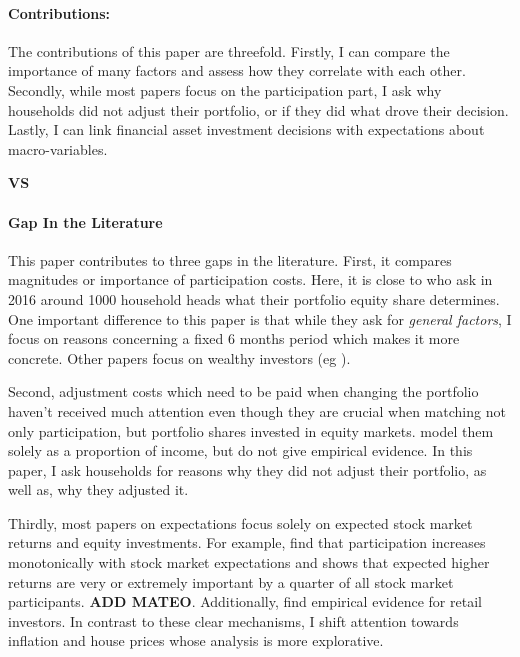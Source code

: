 \documentclass[ProjectABM]{subfiles}
\begin{document}
\paragraph{Contributions:}
The contributions of this paper are threefold. Firstly, I can compare the importance of many factors and assess how they correlate with each other. Secondly, while most papers focus on the participation part, I ask why households did not adjust their portfolio, or if they did what drove their decision. Lastly, I can link financial asset investment decisions with expectations about macro-variables.

\textbf{VS}

\paragraph{Gap In the Literature}
This paper contributes to three gaps in the literature. First, it compares magnitudes or importance of participation costs. Here, it is close to \cite{choi_2020} who ask in 2016 around 1000 household heads what their portfolio equity share determines. One important difference to this paper is that while they ask for \textit{general factors}, I focus on reasons concerning a fixed 6 months period which makes it more concrete. Other papers focus on wealthy investors (eg \cite{bender_et_al_2019}). 

Second, adjustment costs which need to be paid when changing the portfolio haven't received much attention even though they are crucial when matching not only participation, but portfolio shares invested in equity markets. \cite{bonaparte_et_al_2012adjustment} model them solely as a proportion of income, but do not give empirical evidence. In this paper, I ask households for reasons why they did not adjust their portfolio, as well as, why they adjusted it.

Thirdly, most papers on expectations focus solely on expected stock market returns and equity investments. For example, \cite{arrondel_et_al_2014subjective_return_expectation} find that participation increases monotonically with stock market expectations and \cite{choi_2020} shows that expected higher returns are very or extremely important by a quarter of all stock market participants. \textbf{ADD MATEO}. Additionally, \cite{giglio_et_al_2019five} find empirical evidence for retail investors. In contrast to these clear mechanisms, I shift attention towards inflation and house prices whose analysis is more explorative. %
\end{document}
